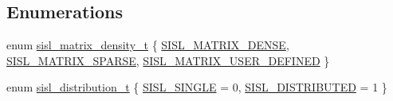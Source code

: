 \subsection*{Enumerations}
\begin{DoxyCompactItemize}
\item 
enum \hyperlink{group__matrix_gae50d4f05ed96de495bdd326c201c28ff}{sisl\-\_\-matrix\-\_\-density\-\_\-t} \{ \hyperlink{group__matrix_ggae50d4f05ed96de495bdd326c201c28ffaae029c486fdd12732f4655d184b0ed57}{S\-I\-S\-L\-\_\-\-M\-A\-T\-R\-I\-X\-\_\-\-D\-E\-N\-S\-E}, 
\hyperlink{group__matrix_ggae50d4f05ed96de495bdd326c201c28ffa0c0ef4a4a8df53f64b9237c1fb4acc75}{S\-I\-S\-L\-\_\-\-M\-A\-T\-R\-I\-X\-\_\-\-S\-P\-A\-R\-S\-E}, 
\hyperlink{group__matrix_ggae50d4f05ed96de495bdd326c201c28ffa64a3cff2469cac8f45575896e548611c}{S\-I\-S\-L\-\_\-\-M\-A\-T\-R\-I\-X\-\_\-\-U\-S\-E\-R\-\_\-\-D\-E\-F\-I\-N\-E\-D}
 \}
\item 
enum \hyperlink{group__matrix_ga03fd8bd724705cd998bb37b51393c0d4}{sisl\-\_\-distribution\-\_\-t} \{ \hyperlink{group__matrix_gga03fd8bd724705cd998bb37b51393c0d4a2c7ad8cda72338a63fc48b67ba475e91}{S\-I\-S\-L\-\_\-\-S\-I\-N\-G\-L\-E} =  0, 
\hyperlink{group__matrix_gga03fd8bd724705cd998bb37b51393c0d4a2719aa856008ad9e5b049874411dc69d}{S\-I\-S\-L\-\_\-\-D\-I\-S\-T\-R\-I\-B\-U\-T\-E\-D} =  1
 \}
\end{DoxyCompactItemize}
